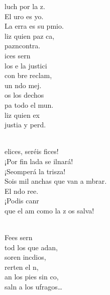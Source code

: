 \documentclass[12pt]{article}
\begin{document}
\begin{multicols*}{2}
\begin{cancion}
	luch por la z.\\
	El uro es yo.\\
	La erra es su pmio.\\
	liz quien paz ca,\\
	pazncontra.\\
	ices sern\\
	los e la justici\\
	con bre reclam,\\
	un ndo mej.\\
	os los dechos\\
	pa todo el mun.\\
	liz quien ex\\
	justia y perd. \\\jump\\
	\begin{chorus}%
	elices, seréis fices!\\
	¡Por fin lada se ilnará!\\
	¡Seomperá la trisza!\\
	Sois mil anchas que van a mbrar.\\
	El ndo ree.\\
	¡Podis canr\\
	que el am como la z os salva!\\
	\end{chorus}%
	\jump\\
	Fees sern\\
	tod los que adan,\\
	soren incdios,\\
	rerten el n,\\
	an los pies sin co,\\
	saln a los ufragos… \\

\end{cancion}
\end{multicols*}
\end{document}
